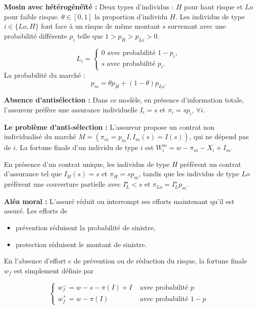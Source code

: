 \begin{f}
	
	\textbf{Mosin avec hétérogénéïté :} Deux types d'individus : \(H\) pour haut risque et \(Lo\) pour faible risque. \(\theta \in[0,1]\) la proportion d'individu \(H\). Les individus de type \(i \in\{Lo, H\}\) font face à un risque de même montant \(s\)  survenant avec une probabilité différente \(p_{i}\) telle que \(1>p_{H}>p_{Lo}>0\).
	
	\[
	L_{i}=\left\{\begin{array}{l}
		0 \text { avec probabilité } 1-p_{i}, \\
		s \text { avec probabilité } p_{i} .
	\end{array}\right.
	\]
La probabilité du marché :
	\[
	p_{m}=\theta p_{H}+(1-\theta) p_{Lo} .
	\]
\medskip

\textbf{Absence d'antisélection :}  Dans ce modèle, en présence d'information totale, l'assureur préfère une assurance individuelle \(I_{i}=s\) et \(\pi_{i}=s p_{i}\), \(\forall i\).

\textbf{Le problème d'anti-sélection : }
L'assureur propose un  contrat non individualisé du marché \(M=\left(\pi_{m}=p_{m} I, I_{m}(s)=I(s)\right)\), qui ne dépend pas de \(i\). La fortune finale d'un individu de type \(i\) est \(W_{i}^{m}=w-\pi_{m}-X_{i}+I_{m}\).

En présence d'un contrat unique, les individus de type \(H\) préfèrent un contrat d'assurance tel que \(I_{H}(s)=s\)  et \(\pi_{H}=s p_{m}\), tandis que les individus de type \(Lo\) préfèrent une couverture partielle avec \(I_{L}^{\star}<s\) et \(\pi_{Lo}=I_{L}^{\star} p_{m}\).
\medskip

\textbf{Aléa moral :}
L'assuré réduit ou interrompt ses efforts maintenant qu'il est assuré. Les efforts de
\begin{itemize}
	\item prévention réduisent la probabilité de sinistre,
	\item protection réduisent le montant de sinistre.
\end{itemize}

 En l'absence d'effort \(e\) de prévention ou de réduction du risque, la fortune finale \(w_{f}\) est simplement définie par

\[
\begin{cases}w_{f}^{-}=w-s-\pi(I)+I & \text { avec probabilité } p \\ w_{f}^{+}=w-\pi(I) & \text { avec probabilité } 1-p\end{cases}
\]


\end{f}
